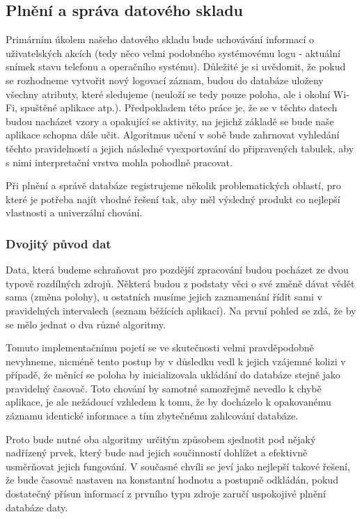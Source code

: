 \documentclass[thesis=M,czech]{FITthesis}[2012/06/26]
\begin{document}
\subsection{Plnění a správa datového skladu}
Primárním úkolem našeho datového skladu bude uchovávání informací o uživatelských akcích (tedy něco velmi podobného systémovému logu - aktuální snímek stavu telefonu a operačního systému). Důležité je si uvědomit, že pokud se rozhodneme vytvořit nový logovací záznam, budou do databáze uloženy všechny atributy, které sledujeme (neuloží se tedy pouze poloha, ale i okolní Wi-Fi, spuštěné aplikace atp.). Předpokladem této práce je, že se v těchto datech budou nacházet vzory a opakující se aktivity, na jejichž základě se bude naše aplikace schopna dále učit. Algoritmus učení v sobě bude zahrnovat vyhledání těchto pravidelností a jejich následné vyexportování do připravených tabulek, aby s nimi interpretační vrstva mohla pohodlně pracovat.

Při plnění a správě databáze registrujeme několik problematických oblastí, pro které je potřeba najít vhodné řešení tak, aby měl výsledný produkt co nejlepší vlastnosti a univerzální chování.

\subsubsection*{Dvojitý původ dat}
Data, která budeme schraňovat pro pozdější zpracování budou pocházet ze dvou typově rozdílných zdrojů. Některá budou z podstaty věci o své změně dávat vědět sama (změna polohy), u ostatních musíme jejich zaznamenání řídit sami v pravidelných intervalech (seznam běžících aplikací). Na první pohled se zdá, že by se mělo jednat o dva různé algoritmy.

Tomuto implementačnímu pojetí se ve skutečnosti velmi pravděpodobně nevyhneme, nicméně tento postup by v důsledku vedl k jejich vzájemné kolizi v případě, že měnící se poloha by inicializovala ukládání do databáze stejně jako pravidelný časovač. Toto chování by samotné samozřejmě nevedlo k chybě aplikace, je ale nežádoucí vzhledem k tomu, že by docházelo k opakovanému záznamu identické informace a tím zbytečnému zahlcování databáze.

Proto bude nutné oba algoritmy určitým způsobem sjednotit pod nějaký nadřízený prvek, který bude nad jejich součinností dohlížet a efektivně usměrňovat jejich fungování. V současné chvíli se jeví jako nejlepší takové řešení, že bude časovač nastaven na konstantní hodnotu a postupně odkládán, pokud dostatečný přísun informací z prvního typu zdroje zaručí uspokojivé plnění databáze daty.
\end{document}
